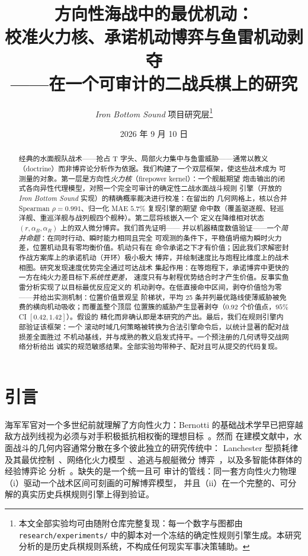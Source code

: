 \documentclass[12pt,a4paper]{ctexart}
\title{\textbf{方向性海战中的最优机动：\\校准火力核、承诺机动博弈与鱼雷机动剥夺\\——在一个可审计的二战兵棋上的研究}}
\author{\emph{Iron Bottom Sound} 项目研究层\thanks{本文全部实验均可由随附仓库完整复现：每一个数字与图都由
\texttt{research/experiments/} 中的脚本对一个冻结的确定性规则引擎生成。本研究分析的是历史兵棋规则系统，不构成任何现实军事决策辅助。}}
\date{2026 年 9 月 10 日}
\begin{document}
\maketitle

\begin{abstract}
经典的水面舰队战术——抢占 T 字头、局部火力集中与鱼雷威胁——通常以教义
（doctrine）而非博弈论分析作为依据。我们构建了一个双层框架，使这些战术成为
可测量的对象。第一层是方向性\emph{火力核}（firepower kernel）：一个舰艇期望
炮击输出的闭式各向异性代理模型，对照一个完全可审计的确定性二战水面战斗规则
引擎（开放的 \emph{Iron Bottom Sound} 实现）的精确概率裁决进行校准：在留出的
几何网格上，核以合并 Spearman $\rho=0.991$、归一化 MAE $5.7\%$ 复现引擎的期望
命中数（覆盖驱逐舰、轻巡洋舰、重巡洋舰与战列舰四个舰种）。第二层将核嵌入一个
定义在降维相对状态 $(r,\alpha_B,\alpha_R)$ 上的双人微分博弈。我们首先证明——
并以机器精度数值验证——一个\emph{简并命题}：在同时行动、瞬时能力相同且完全
可观测的条件下，平稳值坍缩为瞬时火力差，位置机动具有零均衡价值。机动只有在
命令承诺之下才有价值；因此我们求解密封作战方案库上的承诺机动（开环）极小极大
博弈，并绘制速度比与炮程比维度上的战术相图。研究发现速度优势完全通过可达战术
集起作用：在等炮程下，承诺博弈中更快的一方在纯火力差目标下\emph{系统性更差}，
速度只有与射程优势结合时才产生价值。反事实鱼雷分析实现了以目标最优反应定义的
机动剥夺。在低直接命中区间，剥夺价值恰为零——并给出实测机制：位置价值景观呈
阶梯状，平均 25 条并列最优路线使薄威胁被免费的横向机动吸收；而覆盖整个顶层
位置簇的威胁产生显著剥夺（0.92 个价值点，$95\%$ CI $[0.42,1.42]$）。假设的
精化而非确认即是本研究的产出。最后，我们在规则引擎内部验证该框架：一个
滚动时域几何策略被转换为合法引擎命令后，以统计显著的配对战损差全面胜过
不机动基线，并与成熟的教义启发式持平。一个预注册的几何诱导交战网络分析给出
诚实的规范敏感结果。全部实验均带种子、配对且可从提交的代码复现。
\end{abstract}

\section{引言}\label{sec:intro}

海军军官对一个多世纪前就理解了方向性火力：Bernotti 的基础战术学早已把穿越
敌方战列线视为必须与对手积极抵抗相权衡的理想目标~\cite{bernotti1911}。然而
在建模文献中，水面战斗的几何内容通常分散在多个彼此独立的研究传统中：
Lanchester 型损耗律及其最优控制~\cite{taylor1974,protopopescu1989,
gonzalez2011}、网络化火力模型~\cite{networked2020}、追逃与舰艇微分
博弈~\cite{solis2020,weintraub2020,cubic1993}，以及多智能体群体的经验博弈论
分析~\cite{lanctot2017,wellman2024,omidshafiei2019}。缺失的是一个统一且可
审计的管线：同一套方向性火力物理（i）驱动一个战术区间可刻画的可解博弈模型，
并且（ii）在一个完整的、可分解的真实历史兵棋规则引擎上得到验证。
\end{document}
